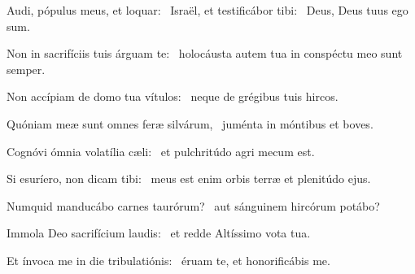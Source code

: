 
\item Audi, pópulus meus, et loquar:~\pscross{} Israël, et testificábor tibi:~\psstar{} Deus, Deus tuus ego sum.

\item Non in sacrifíciis tuis árguam te:~\psstar{} holocáusta autem tua in conspéctu meo sunt semper.

\item Non accípiam de domo tua vítulos:~\psstar{} neque de grégibus tuis hircos.

\item Quóniam meæ sunt omnes feræ silvárum,~\psstar{} juménta in móntibus et boves.

\item Cognóvi ómnia volatília cæli:~\psstar{} et pulchritúdo agri mecum est.

\item Si esuríero, non dicam tibi:~\psstar{} meus est enim orbis terræ et plenitúdo ejus.

\item Numquid manducábo carnes taurórum?~\psstar{} aut sánguinem hircórum potábo?

\item Immola Deo sacrifícium laudis:~\psstar{} et redde Altíssimo vota tua.

\item Et ínvoca me in die tribulatiónis:~\psstar{} éruam te, et honorificábis me.
